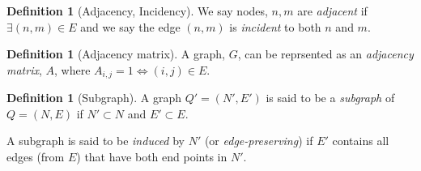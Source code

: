 \documentclass[a4paper,10pt]{article}
\theoremstyle{definition}
\newtheorem{definition}[theorem]{Definition}
\theoremstyle{definition}
\theoremstyle{remark}
\theoremstyle{definition}
\begin{document}
\begin{definition}[Adjacency, Incidency]
We say nodes, $n,m$ are \textit{adjacent} if $\exists (n,m) \in E$ and we say the edge $(n,m)$ is \textit{incident} to both $n$ and $m$.
\end{definition}

\begin{definition}[Adjacency matrix]
A graph, $G$, can be reprsented as an \textit{adjacency matrix}, $A$, where $A_{i,j}=1 \iff (i,j) \in E$.
\end{definition}

\begin{definition}[Subgraph]
A graph $Q'=(N',E')$ is said to be a \textit{subgraph} of $Q=(N,E)$ if $N' \subset N$ and $E' \subset E$.

A subgraph is said to be \textit{induced} by $N'$ (or \textit{edge-preserving}) if $E'$ contains all edges (from $E$) that have both end points in $N'$.
\end{definition}
\end{document}
